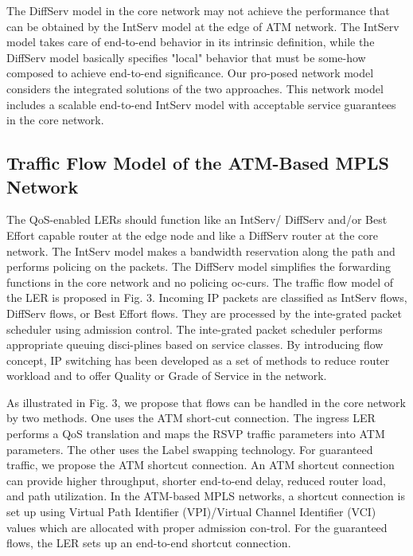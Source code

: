 \documentclass[10pt, twocolumn, twoside]{etri}
\begin{document}
The DiffServ model in the core network may not achieve the performance
that can be obtained by the IntServ model at the edge of ATM network. The
IntServ model takes care of end-to-end behavior in its intrinsic
definition, while the DiffServ model basically specifies "local" behavior
that must be some-how composed to achieve end-to-end significance. Our
pro-posed network model considers the integrated solutions of the two
approaches. This network model includes a scalable end-to-end IntServ
model with acceptable service guarantees in the core network.

\subsection{Traffic Flow Model of the ATM-Based MPLS Network}

The QoS-enabled LERs should function like an IntServ/ DiffServ and/or
Best Effort capable router at the edge node and like a DiffServ router
at the core network. The IntServ model makes a bandwidth reservation
along the path and performs policing on the packets. The DiffServ model
simplifies the forwarding functions in the core network and no policing
oc-curs. The traffic flow model of the LER is proposed in Fig. 3. Incoming
IP packets are classified as IntServ flows, DiffServ flows, or Best
Effort flows. They are processed by the inte-grated packet scheduler using
admission control. The inte-grated packet scheduler performs appropriate
queuing disci-plines based on service classes. By introducing flow
concept, IP switching has been developed as a set of methods to reduce
router workload and to offer Quality or Grade of Service in the network.

As illustrated in Fig. 3, we propose that flows can be handled in the core
network by two methods. One uses the ATM short-cut connection. The ingress
LER performs a QoS translation and maps the RSVP traffic parameters
into ATM parameters. The other uses the Label swapping technology. For
guaranteed traffic, we propose the ATM shortcut connection. An ATM
shortcut connection can provide higher throughput, shorter end-to-end
delay, reduced router load, and path utilization. In the ATM-based MPLS
networks, a shortcut connection is set up using Virtual Path Identifier
(VPI)/Virtual Channel Identifier (VCI) values which are allocated with
proper admission con-trol. For the guaranteed flows, the LER sets up an
end-to-end shortcut connection.
\end{document}
